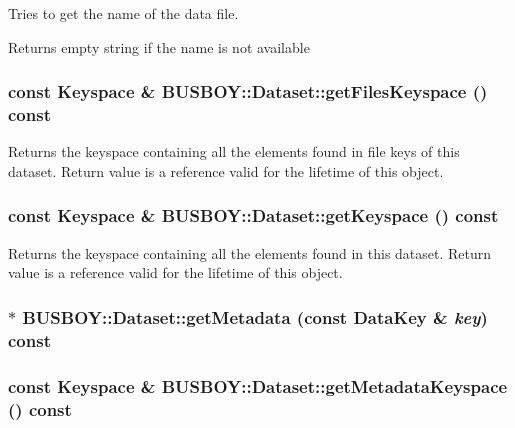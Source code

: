 Tries to get the name of the data file. \begin{DoxyReturn}{Returns}
empty string if the name is not available 
\end{DoxyReturn}
\hypertarget{classBUSBOY_1_1Dataset_a5ad9a39da9d07b2713cdb15fdd9790e0}{
\subsubsection[{getFilesKeyspace}]{\setlength{\rightskip}{0pt plus 5cm}const {\bf Keyspace} \& BUSBOY::Dataset::getFilesKeyspace () const}}
\label{classBUSBOY_1_1Dataset_a5ad9a39da9d07b2713cdb15fdd9790e0}


Returns the keyspace containing all the elements found in file keys of this dataset. Return value is a reference valid for the lifetime of this object. \hypertarget{classBUSBOY_1_1Dataset_a6dfa90bee900df4e797ae4e383b21d15}{
\subsubsection[{getKeyspace}]{\setlength{\rightskip}{0pt plus 5cm}const {\bf Keyspace} \& BUSBOY::Dataset::getKeyspace () const}}
\label{classBUSBOY_1_1Dataset_a6dfa90bee900df4e797ae4e383b21d15}


Returns the keyspace containing all the elements found in this dataset. Return value is a reference valid for the lifetime of this object. \hypertarget{classBUSBOY_1_1Dataset_a5f3077140eb5028fbfe0c4a606b31e5e}{
\subsubsection[{getMetadata}]{ $\ast$ BUSBOY::Dataset::getMetadata (const {\bf DataKey} \& {\em key}) const}}
\label{classBUSBOY_1_1Dataset_a5f3077140eb5028fbfe0c4a606b31e5e}
\hypertarget{classBUSBOY_1_1Dataset_a4e05ba67c721535013ee6bd0c3565585}{
\subsubsection[{getMetadataKeyspace}]{\setlength{\rightskip}{0pt plus 5cm}const {\bf Keyspace} \& BUSBOY::Dataset::getMetadataKeyspace () const}}
\label{classBUSBOY_1_1Dataset_a4e05ba67c721535013ee6bd0c3565585}


